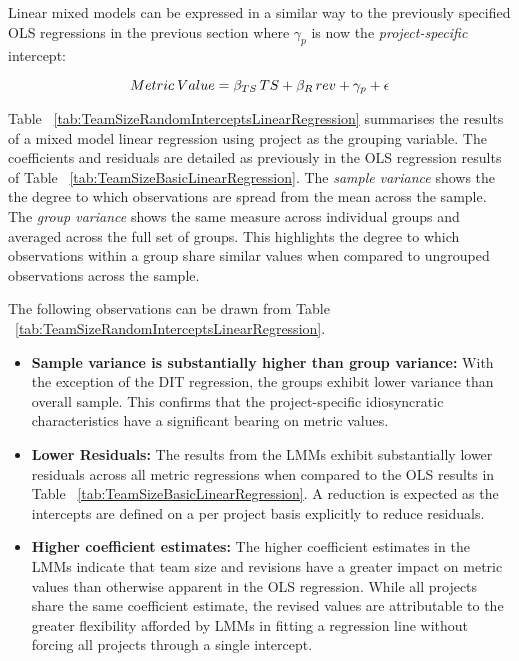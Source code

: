 Linear mixed models can be expressed in a similar way to the previously specified OLS regressions in the previous section where $\gamma_p$ is now the \textit{project-specific} intercept:

\[\large Metric \: Value = \beta_{TS}\, TS +  \beta_{R}\, rev +  \gamma_p + \epsilon \]

Table ~\ref{tab:TeamSizeRandomInterceptsLinearRegression} summarises the results of a mixed model linear regression using project as the grouping variable. The coefficients and residuals are detailed as previously in the OLS regression results of Table ~\ref{tab:TeamSizeBasicLinearRegression}. The \textit{sample variance} shows the the degree to which observations are spread from the mean across the sample. The \textit{group variance} shows the same measure across individual groups and averaged across the full set of groups. This highlights the degree to which observations within a group share similar values when compared to ungrouped observations across the sample.

The following observations can be drawn from Table ~\ref{tab:TeamSizeRandomInterceptsLinearRegression}.

\begin{itemize}

\item  \textbf{Sample variance is substantially higher than group variance:} With the exception of the DIT regression, the groups exhibit lower variance than overall sample. This confirms that the  project-specific idiosyncratic characteristics have a significant bearing on metric values.

\item  \textbf{Lower Residuals:} The results from the LMMs exhibit substantially lower residuals across all metric regressions when compared to the OLS results in Table ~\ref{tab:TeamSizeBasicLinearRegression}. A reduction is expected as the intercepts are defined on a per project basis explicitly to reduce residuals.

\item  \textbf{Higher coefficient estimates:} The higher coefficient estimates in the LMMs indicate that team size and revisions have a greater impact on metric values than otherwise apparent in the OLS regression. While all projects share the same coefficient estimate, the revised values are attributable to the greater flexibility afforded by LMMs in fitting a regression line without forcing all projects through a single intercept.
\end{itemize}


